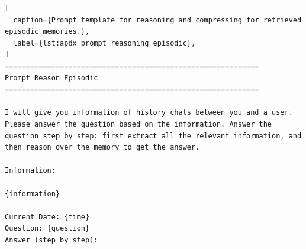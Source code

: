 \begin{lstlisting}[
  caption={Prompt template for reasoning and compressing for retrieved episodic memories.},
  label={lst:apdx_prompt_reasoning_episodic},
]
============================================================
Prompt Reason_Episodic
============================================================

I will give you information of history chats between you and a user. Please answer the question based on the information. Answer the question step by step: first extract all the relevant information, and then reason over the memory to get the answer.

Information:

{information}

Current Date: {time}
Question: {question}
Answer (step by step):
\end{lstlisting}

